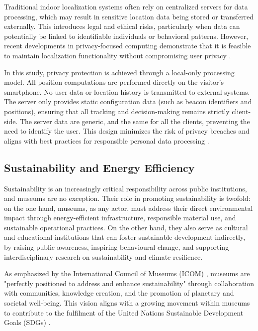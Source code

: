 Traditional indoor localization systems often rely on centralized servers for data processing, which may result in sensitive location data being stored or transferred externally. This introduces legal and ethical risks, particularly when data can potentially be linked to identifiable individuals or behavioral patterns. However, recent developments in privacy-focused computing demonstrate that it is feasible to maintain localization functionality without compromising user privacy \cite{alletto_indoor_2016, spachos_ble_2020}.

In this study, privacy protection is achieved through a local-only processing model. All position computations are performed directly on the visitor’s smartphone. No user data or location history is transmitted to external systems. The server only provides static configuration data (such as beacon identifiers and positions), ensuring that all tracking and decision-making remains strictly client-side. The server data are generic, and the same for all the clients, preventing the need to identify the user. This design minimizes the risk of privacy breaches and aligns with best practices for responsible personal data processing \cite{cnil-recomendation-mobile}.

\subsection{Sustainability and Energy Efficiency}

Sustainability is an increasingly critical responsibility across public institutions, and museums are no exception. Their role in promoting sustainability is twofold: on the one hand, museums, as any actor, must address their direct environmental impact through energy-efficient infrastructure, responsible material use, and sustainable operational practices. On the other hand, they also serve as cultural and educational institutions that can foster sustainable development indirectly, by raising public awareness, inspiring behavioural change, and supporting interdisciplinary research on sustainability and climate resilience.

As emphasized by the International Council of Museums (ICOM) \cite{icom_sustainability}, museums are "perfectly positioned to address and enhance sustainability" through collaboration with communities, knowledge creation, and the promotion of planetary and societal well-being. This vision aligns with a growing movement within museums to contribute to the fulfilment of the United Nations Sustainable Development Goals (SDGs) \cite{onofri_life_2024, rodriguez_contribution_2024}.

